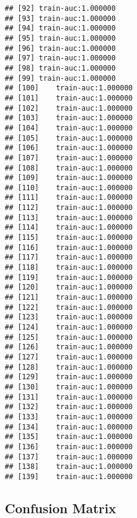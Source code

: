 \documentclass[11pt,]{article}
\newenvironment{Shaded}{\begin{snugshade}}{\end{snugshade}}
\newcommand{\KeywordTok}[1]{\textcolor[rgb]{0.13,0.29,0.53}{\textbf{#1}}}
\newcommand{\DecValTok}[1]{\textcolor[rgb]{0.00,0.00,0.81}{#1}}
\newcommand{\FloatTok}[1]{\textcolor[rgb]{0.00,0.00,0.81}{#1}}
\newcommand{\StringTok}[1]{\textcolor[rgb]{0.31,0.60,0.02}{#1}}
\newcommand{\CommentTok}[1]{\textcolor[rgb]{0.56,0.35,0.01}{\textit{#1}}}
\newcommand{\OperatorTok}[1]{\textcolor[rgb]{0.81,0.36,0.00}{\textbf{#1}}}
\newcommand{\NormalTok}[1]{#1}
\begin{document}
\begin{verbatim}
## [92] train-auc:1.000000 
## [93] train-auc:1.000000 
## [94] train-auc:1.000000 
## [95] train-auc:1.000000 
## [96] train-auc:1.000000 
## [97] train-auc:1.000000 
## [98] train-auc:1.000000 
## [99] train-auc:1.000000 
## [100]    train-auc:1.000000 
## [101]    train-auc:1.000000 
## [102]    train-auc:1.000000 
## [103]    train-auc:1.000000 
## [104]    train-auc:1.000000 
## [105]    train-auc:1.000000 
## [106]    train-auc:1.000000 
## [107]    train-auc:1.000000 
## [108]    train-auc:1.000000 
## [109]    train-auc:1.000000 
## [110]    train-auc:1.000000 
## [111]    train-auc:1.000000 
## [112]    train-auc:1.000000 
## [113]    train-auc:1.000000 
## [114]    train-auc:1.000000 
## [115]    train-auc:1.000000 
## [116]    train-auc:1.000000 
## [117]    train-auc:1.000000 
## [118]    train-auc:1.000000 
## [119]    train-auc:1.000000 
## [120]    train-auc:1.000000 
## [121]    train-auc:1.000000 
## [122]    train-auc:1.000000 
## [123]    train-auc:1.000000 
## [124]    train-auc:1.000000 
## [125]    train-auc:1.000000 
## [126]    train-auc:1.000000 
## [127]    train-auc:1.000000 
## [128]    train-auc:1.000000 
## [129]    train-auc:1.000000 
## [130]    train-auc:1.000000 
## [131]    train-auc:1.000000 
## [132]    train-auc:1.000000 
## [133]    train-auc:1.000000 
## [134]    train-auc:1.000000 
## [135]    train-auc:1.000000 
## [136]    train-auc:1.000000 
## [137]    train-auc:1.000000 
## [138]    train-auc:1.000000 
## [139]    train-auc:1.000000
\end{verbatim}

\begin{Shaded}
\end{Shaded}

\subsection{Confusion Matrix}\label{confusion-matrix}
\end{document}
